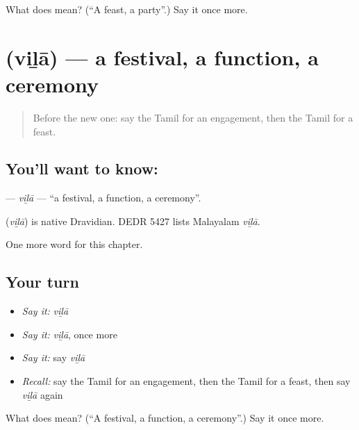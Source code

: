 \begin{tcolorbox}[breakable,colback=teal!4,colframe=teal!35!black,title={Before you move on}]
What does  mean? (\textquotedblleft{}A feast, a party\textquotedblright{}.) Say it once more.
\end{tcolorbox}
\section[\texorpdfstring{\ta{விழா} (viḻā)}{விழா (viḻā)}]{ (viḻā) — a festival, a function, a ceremony}

\label{lesson:TA-C217-vila}



\begin{quote}
Before the new one: say the Tamil for an engagement, then the Tamil for a feast.
\end{quote}

\subsection*{You'll want to know: }
\textbf{} — \emph{viḻā} — \textquotedblleft{}a festival, a function, a ceremony\textquotedblright{}.

\begin{cousinweb}
\textbf{} (\emph{viḻā}) is native Dravidian. DEDR 5427 lists Malayalam \emph{viḻā}.
\end{cousinweb}

\begin{grammarlens}[title={What you've built}]
One more word for this chapter.
\end{grammarlens}

\subsection*{Your turn}
\begin{itemize}
\raggedright
  \item \emph{Say it:} \emph{viḻā}
  \item \emph{Say it:} \emph{viḻā}, once more
  \item \emph{Say it:} say \emph{viḻā}
  \item \emph{Recall:} say the Tamil for an engagement, then the Tamil for a feast, then say \emph{viḻā} again
\end{itemize}

\begin{tcolorbox}[breakable,colback=teal!4,colframe=teal!35!black,title={Before you move on}]
What does  mean? (\textquotedblleft{}A festival, a function, a ceremony\textquotedblright{}.) Say it once more.
\end{tcolorbox}
